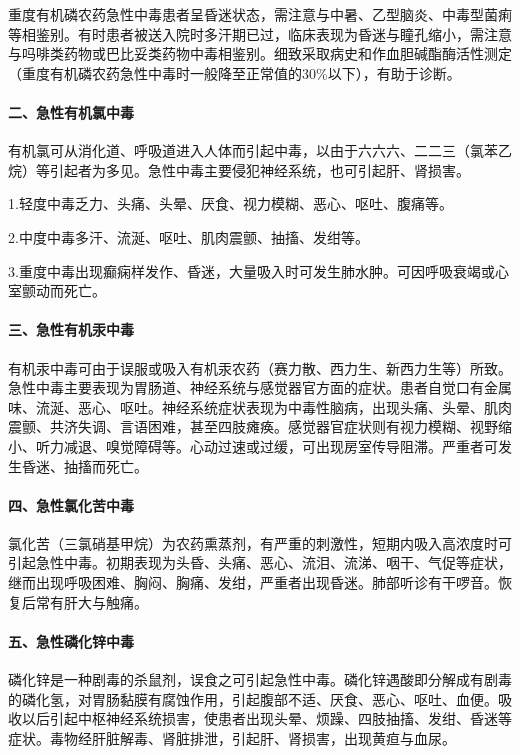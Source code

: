 重度有机磷农药急性中毒患者呈昏迷状态，需注意与中暑、乙型脑炎、中毒型菌痢等相鉴别。有时患者被送入院时多汗期已过，临床表现为昏迷与瞳孔缩小，需注意与吗啡类药物或巴比妥类药物中毒相鉴别。细致采取病史和作血胆碱酯酶活性测定（重度有机磷农药急性中毒时一般降至正常值的30\%以下），有助于诊断。

\paragraph{二、急性有机氯中毒}

有机氯可从消化道、呼吸道进入人体而引起中毒，以由于六六六、二二三（氯苯乙烷）等引起者为多见。急性中毒主要侵犯神经系统，也可引起肝、肾损害。

1.轻度中毒乏力、头痛、头晕、厌食、视力模糊、恶心、呕吐、腹痛等。

2.中度中毒多汗、流涎、呕吐、肌肉震颤、抽搐、发绀等。

3.重度中毒出现癫痫样发作、昏迷，大量吸入时可发生肺水肿。可因呼吸衰竭或心室颤动而死亡。

\paragraph{三、急性有机汞中毒}

有机汞中毒可由于误服或吸入有机汞农药（赛力散、西力生、新西力生等）所致。急性中毒主要表现为胃肠道、神经系统与感觉器官方面的症状。患者自觉口有金属味、流涎、恶心、呕吐。神经系统症状表现为中毒性脑病，出现头痛、头晕、肌肉震颤、共济失调、言语困难，甚至四肢瘫痪。感觉器官症状则有视力模糊、视野缩小、听力减退、嗅觉障碍等。心动过速或过缓，可出现房室传导阻滞。严重者可发生昏迷、抽搐而死亡。

\paragraph{四、急性氯化苦中毒}

氯化苦（三氯硝基甲烷）为农药熏蒸剂，有严重的刺激性，短期内吸入高浓度时可引起急性中毒。初期表现为头昏、头痛、恶心、流泪、流涕、咽干、气促等症状，继而出现呼吸困难、胸闷、胸痛、发绀，严重者出现昏迷。肺部听诊有干啰音。恢复后常有肝大与触痛。

\paragraph{五、急性磷化锌中毒}

磷化锌是一种剧毒的杀鼠剂，误食之可引起急性中毒。磷化锌遇酸即分解成有剧毒的磷化氢，对胃肠黏膜有腐蚀作用，引起腹部不适、厌食、恶心、呕吐、血便。吸收以后引起中枢神经系统损害，使患者出现头晕、烦躁、四肢抽搐、发绀、昏迷等症状。毒物经肝脏解毒、肾脏排泄，引起肝、肾损害，出现黄疸与血尿。

